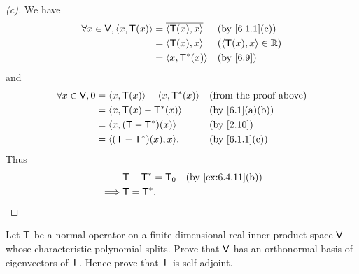 \begin{proof}[(c)]
  We have
  \begin{align*}
    \forall x \in \V, \inn{x, \T(x)} & = \conj{\inn{\T(x), x}} &  & \text{(by \cref{6.1.1}(c))} \\
                                     & = \inn{\T(x), x}        &  & (\inn{\T(x), x} \in \R)     \\
                                     & = \inn{x, \T^*(x)}      &  & \text{(by \cref{6.9})}
  \end{align*}
  and
  \begin{align*}
    \forall x \in \V, 0 & = \inn{x, \T(x)} - \inn{x, \T^*(x)} &  & \text{(from the proof above)} \\
                        & = \inn{x, \T(x) - \T^*(x)}          &  & \text{(by \cref{6.1}(a)(b))}  \\
                        & = \inn{x, (\T - \T^*)(x)}           &  & \text{(by \cref{2.10})}       \\
                        & = \inn{(\T - \T^*)(x), x}.          &  & \text{(by \cref{6.1.1}(c))}
  \end{align*}
  Thus
  \begin{align*}
             & \T - \T^* = \zT &  & \text{(by \cref{ex:6.4.11}(b))} \\
    \implies & \T = \T^*.
  \end{align*}
\end{proof}

\begin{ex}\label{ex:6.4.12}
  Let \(\mathsf{T}\) be a normal operator on a finite-dimensional real inner product space \(\mathsf{V}\) whose characteristic polynomial splits.
  Prove that \(\mathsf{V}\) has an orthonormal basis of eigenvectors of \(\mathsf{T}\).
  Hence prove that \(\mathsf{T}\) is self-adjoint.
\end{ex}

